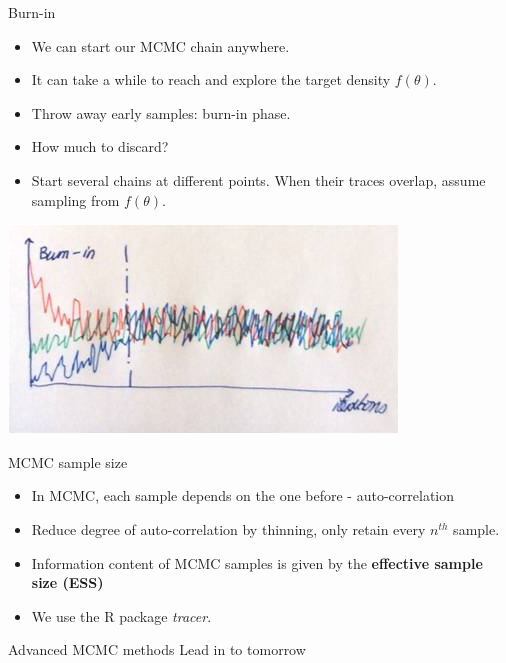 \documentclass[compress]{beamer}
\begin{document}
\begin{frame}[label=sec-8-9]{Burn-in}
\begin{itemize}
\item We can start our MCMC chain anywhere.
\item It can take a while to reach and explore the target density $f(\theta)$.
\item Throw away early samples: \alert{burn-in} phase.
\item How much to discard?
\item Start several chains at different points. When their traces overlap, assume sampling from $f(\theta)$.
\end{itemize}
\includegraphics[width=.7\linewidth]{Burn}
\end{frame} 

\begin{frame}[label=sec-8-10]{MCMC sample size}
\begin{itemize}
\item In MCMC, each sample depends on the one before - \alert{auto-correlation}
\item Reduce degree of auto-correlation by \alert{thinning}, only retain every $n^{th}$ sample. 
\item Information content of MCMC samples is given by the \textbf{effective sample size (ESS)}
\item We use the R package \textit{tracer}.
\end{itemize}
\end{frame}

\begin{frame}[label=sec-8-11]{Advanced MCMC methods}
Lead in to tomorrow
\end{frame}
\end{document}
